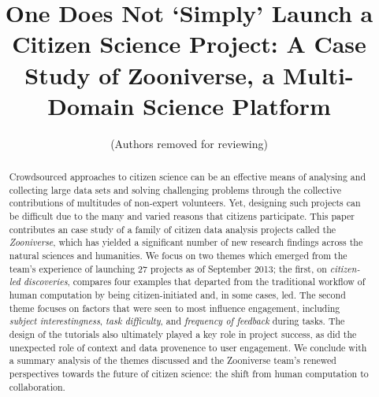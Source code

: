 \documentclass{sigchi}
\begin{document}
\title{One Does Not `Simply' Launch a Citizen Science Project: A Case Study of Zooniverse, a Multi-Domain Science Platform}

 \author{ (Authors removed for reviewing) }
% 
% 
% 


\maketitle

\begin{abstract}
Crowdsourced approaches to citizen science can be an effective means of analysing and collecting large data sets and solving challenging problems through the collective contributions of multitudes of non-expert volunteers. Yet, designing such projects can be difficult due to the many and varied reasons that citizens participate. This paper contributes an case study of a family of citizen data analysis projects called the \emph{Zooniverse}, which has yielded a significant number of new research findings across the natural sciences and humanities.  We focus on two themes which emerged from the team's experience of launching 27 projects as of September 2013; the first, on \emph{citizen-led discoveries}, compares four examples that departed from the traditional workflow of human computation by being citizen-initiated and, in some cases, led.  The second theme focuses on factors that were seen to most influence engagement, including \emph{subject interestingness}, \emph{task difficulty}, and \emph{frequency of feedback} during tasks.  The design of the tutorials also ultimately played a key role in project success, as did the unexpected role of context and data provenence to user engagement.  We conclude with a summary analysis of the themes discussed and the Zooniverse team's renewed perspectives towards the future of citizen science: the shift from human computation to collaboration.
\end{abstract}


\end{document}
